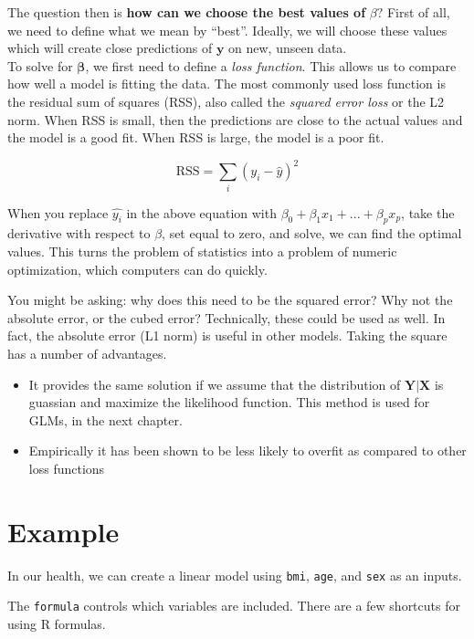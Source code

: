 \documentclass[]{book}
\providecommand{\tightlist}{%
  \setlength{\itemsep}{0pt}\setlength{\parskip}{0pt}}
\begin{document}
The question then is \textbf{how can we choose the best values of} \(\beta?\) First of all, we need to define what we mean by ``best''. Ideally, we will choose these values which will create close predictions of \(\mathbf{y}\) on new, unseen data.\\
To solve for \(\mathbf{\beta}\), we first need to define a \emph{loss function}. This allows us to compare how well a model is fitting the data. The most commonly used loss function is the residual sum of squares (RSS), also called the \emph{squared error loss} or the L2 norm. When RSS is small, then the predictions are close to the actual values and the model is a good fit. When RSS is large, the model is a poor fit.

\[
\text{RSS} = \sum_i(y_i - \hat{y})^2
\]

When you replace \(\hat{y_i}\) in the above equation with \(\beta_0 + \beta_1 x_1 + ... + \beta_p x_p\), take the derivative with respect to \(\beta\), set equal to zero, and solve, we can find the optimal values. This turns the problem of statistics into a problem of numeric optimization, which computers can do quickly.

You might be asking: why does this need to be the squared error? Why not the absolute error, or the cubed error? Technically, these could be used as well. In fact, the absolute error (L1 norm) is useful in other models. Taking the square has a number of advantages.

\begin{itemize}
\tightlist
\item
  It provides the same solution if we assume that the distribution of \(\mathbf{Y}|\mathbf{X}\) is guassian and maximize the likelihood function. This method is used for GLMs, in the next chapter.
\item
  Empirically it has been shown to be less likely to overfit as compared to other loss functions
\end{itemize}

\hypertarget{example}{%
\section{Example}\label{example}}

In our health, we can create a linear model using \texttt{bmi}, \texttt{age}, and \texttt{sex} as an inputs.

The \texttt{formula} controls which variables are included. There are a few shortcuts for using R formulas.
\end{document}
